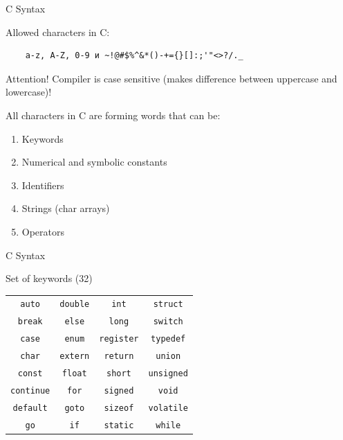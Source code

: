 \begin{frame}[fragile]{C Syntax}

  \begin{block}{Allowed characters in C:}
  \begin{verbatim}
    a-z, A-Z, 0-9 и ~!@#$%^&*()-+={}[]:;'"<>?/._  
  \end{verbatim}
  \end{block}

    \begin{alertblock}{Attention!}
    Compiler is case sensitive (makes difference between uppercase and lowercase)!
    \end{alertblock}

    All characters in C are forming words that can be:
    \begin{enumerate}
    \item Keywords
    \item Numerical and symbolic constants
    \item Identifiers
    \item Strings (char arrays)
    \item Operators
    \end{enumerate}

\end{frame}

\begin{frame}{C Syntax}

    \begin{block}{Set of keywords (32)}

    \begin{tabular}{c c c c}
        \texttt{auto} & \texttt{double} & \texttt{int} & \texttt{struct} \\
        \texttt{break} & \texttt{else} & \texttt{long} & \texttt{switch} \\
        \texttt{case} & \texttt{enum} & \texttt{register} & \texttt{typedef} \\
        \texttt{char} & \texttt{extern} & \texttt{return} & \texttt{union} \\
        \texttt{const} & \texttt{float} & \texttt{short} & \texttt{unsigned} \\
        \texttt{continue} & \texttt{for} & \texttt{signed} & \texttt{void} \\
        \texttt{default} & \texttt{goto} & \texttt{sizeof} & \texttt{volatile} \\
        \texttt{go} & \texttt{if} & \texttt{static} & \texttt{while}
    \end{tabular}
    \end{block}
\end{frame}

